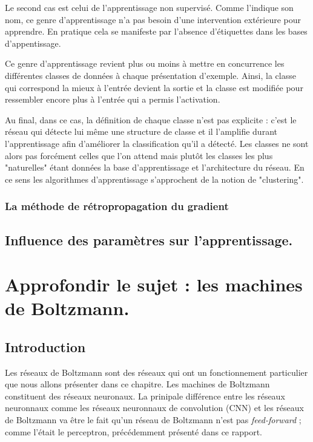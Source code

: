 \documentclass[a4paper,twoside]{report}
\begin{document}
                Le second cas est celui de l'apprentissage non supervisé. Comme l'indique son nom, ce genre d'apprentissage n'a pas besoin d'une intervention extérieure pour apprendre. En pratique cela se manifeste par l'absence d'étiquettes dans les bases d'appentissage.

                Ce genre d'apprentissage revient plus ou moins à mettre en concurrence les différentes classes de données à chaque présentation d'exemple. Ainsi, la classe qui correspond la mieux à l'entrée devient la sortie et la classe est modifiée pour ressembler encore plus à l'entrée qui a permis l'activation.

                Au final, dans ce cas, la définition de chaque classe n'est pas explicite : c'est le réseau qui détecte lui même une structure de classe et il l'amplifie durant l'apprentissage afin d'améliorer la classification qu'il a détecté. Les classes ne sont alors pas forcément celles que l'on attend mais plutôt les classes les plus "naturelles" étant données la base d'apprentissage et l'architecture du réseau. En ce sens les algorithmes d'apprentissage s'approchent de la notion de "clustering".


            \section{La méthode de rétropropagation du gradient}

                



        \chapter{Influence des paramètres sur l'apprentissage.}




    \part[Machines de Boltzmann]{Approfondir le sujet : les machines de Boltzmann.}

        \chapter{Introduction}

            Les réseaux de Boltzmann sont des réseaux qui ont un fonctionnement
            particulier que nous allons présenter dans ce chapitre. Les machines de
            Boltzmann constituent des réseaux neuronaux. La prinipale différence entre
            les réseaux neuronnaux comme les réseaux neuronnaux de convolution (CNN) et
            les  réseaux de Boltzmann va être le fait qu'un réseau de Boltzmann n'est
            pas \textit{feed-forward} ; comme l'était le perceptron, précédemment présenté dans ce
            rapport.
\end{document}
